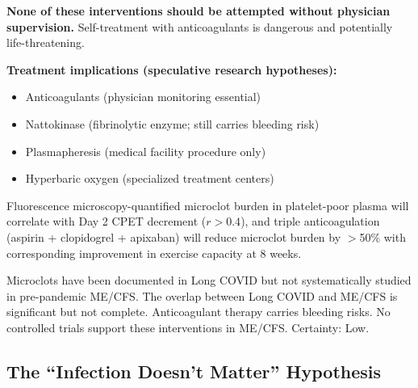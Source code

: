 \begin{hypothesis}
\begin{warning}
\textbf{None of these interventions should be attempted without physician supervision.} Self-treatment with anticoagulants is dangerous and potentially life-threatening.
\end{warning}

\textbf{Treatment implications (speculative research hypotheses):}
\begin{itemize}
    \item Anticoagulants (physician monitoring essential)
    \item Nattokinase (fibrinolytic enzyme; still carries bleeding risk)
    \item Plasmapheresis (medical facility procedure only)
    \item Hyperbaric oxygen (specialized treatment centers)
\end{itemize}
\end{hypothesis}

\begin{prediction}
\label{pred:microclot}
Fluorescence microscopy-quantified microclot burden in platelet-poor plasma will correlate with Day 2 CPET decrement ($r > 0.4$), and triple anticoagulation (aspirin + clopidogrel + apixaban) will reduce microclot burden by $>$50\% with corresponding improvement in exercise capacity at 8 weeks.
\end{prediction}

\begin{warning}
Microclots have been documented in Long COVID but not systematically studied in pre-pandemic ME/CFS. The overlap between Long COVID and ME/CFS is significant but not complete. Anticoagulant therapy carries bleeding risks. No controlled trials support these interventions in ME/CFS. Certainty: Low.
\end{warning}

\subsection{The ``Infection Doesn't Matter'' Hypothesis}
\label{sec:infection-irrelevant}

